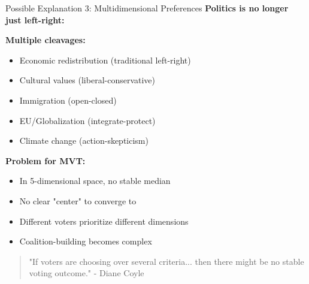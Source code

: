 \documentclass[10pt]{beamer}
\begin{document}
\begin{frame}{Possible Explanation 3: Multidimensional Preferences}
\textbf{Politics is no longer just left-right:}



\textbf{Multiple cleavages:}
\begin{itemize}
\item Economic redistribution (traditional left-right)
\item Cultural values (liberal-conservative)
\item Immigration (open-closed)
\item EU/Globalization (integrate-protect)
\item Climate change (action-skepticism)
\end{itemize}



\textbf{Problem for MVT:}
\begin{itemize}
\item In 5-dimensional space, \alert{no stable median}
\item No clear "center" to converge to
\item Different voters prioritize different dimensions
\item Coalition-building becomes complex
\end{itemize}



\begin{quote}
"If voters are choosing over several criteria... then there might be no stable voting outcome." - Diane Coyle
\end{quote}
\end{frame}
\end{document}
